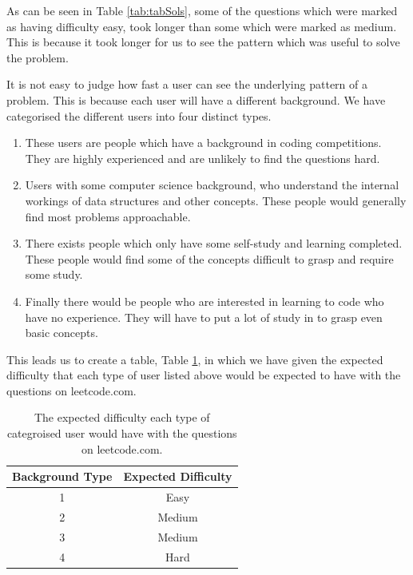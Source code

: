 \documentclass[10pt,twocolumn]{IEEEtran}
\begin{document}
\par As can be seen in Table \ref{tab:tabSols}, some of the questions which were marked as having difficulty easy, took longer than some which were marked as medium. This is because it took longer for us to see the pattern which was useful to solve the problem.
\par It is not easy to judge how fast a user can see the underlying pattern of a problem. This is because each user will have a different background. We have categorised the different users into four distinct types. 
\begin{enumerate}
\item{These users are people which have a background in coding competitions. They are highly experienced and are unlikely to find the questions hard.}
\item{Users with some computer science background, who understand the internal workings of data structures and other concepts. These people would generally find most problems approachable.}
\item{There exists people which only have some self-study and learning completed. These people would find some of the concepts difficult to grasp and require some study.}
\item{Finally there would be people who are interested in learning to code who have no experience. They will have to put a lot of study in to grasp even basic concepts.}
\end{enumerate}
This leads us to create a table, Table \ref{tab:difficulty}, in which we have given the expected difficulty that each type of user listed above would be expected to have with the questions on leetcode.com.
\begin{table}[t]
\centering
	\begin{tabular}{| c | c |} \hline
		   Background Type &Expected Difficulty \\ \hline
		1 & Easy \\ \hline
		2 & Medium \\ \hline
		3 & Medium  \\ \hline
		4 & Hard  \\ \hline
	\end{tabular}
	\caption{The expected difficulty each type of categroised user would have with the questions on leetcode.com.}
	\label{tab:difficulty}
\end{table}
\end{document}
